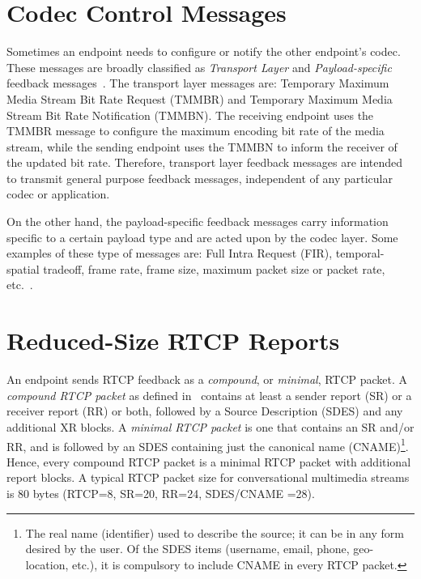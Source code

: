 

\section{Codec Control Messages}

Sometimes an endpoint needs to configure or notify the other endpoint's codec.
These messages are broadly classified as \emph{Transport Layer} and \emph
{Payload-specific} feedback messages~\cite{rfc4585, rfc5104}. The transport
layer messages are: Temporary Maximum Media Stream Bit Rate Request (TMMBR)
and Temporary Maximum Media Stream Bit Rate Notification (TMMBN). The
receiving endpoint uses the TMMBR message to configure the maximum encoding
bit rate of the media stream, while the sending endpoint uses the TMMBN to
inform the receiver of the updated bit rate. Therefore, transport layer
feedback messages are intended to transmit general purpose feedback messages,
independent of any particular codec or application.

On the other hand, the payload-specific feedback messages carry information
specific to a certain payload type and are acted upon by the codec layer. Some
examples of these type of messages are: Full Intra Request (FIR), 
temporal-spatial tradeoff, frame rate, frame size, maximum packet size or packet rate,
etc.~\cite{draft.avt.cop}.

\section{Reduced-Size RTCP Reports}

An endpoint sends RTCP feedback as a \emph{compound}, or \emph{minimal}, RTCP
packet. A \emph{compound RTCP packet} as defined in~\cite{rfc3585} contains
at least a sender report (SR) or a receiver report (RR) or both, followed by
a Source Description (SDES) and any additional XR blocks. A \emph{minimal RTCP
packet} is one that contains an SR and/or RR, and is followed by an SDES
containing just the canonical name (CNAME)\footnote{The real name
(identifier) used to describe the source; it can be in any form desired by the
user. Of the SDES items (username, email, phone, geo-location, etc.), it is 
compulsory to include CNAME in every RTCP packet.}. Hence, every compound RTCP
packet is a minimal RTCP packet with additional report blocks. A typical RTCP
packet size for conversational multimedia streams is 80 bytes (RTCP=8, SR=20,
RR=24, SDES/CNAME =28).

